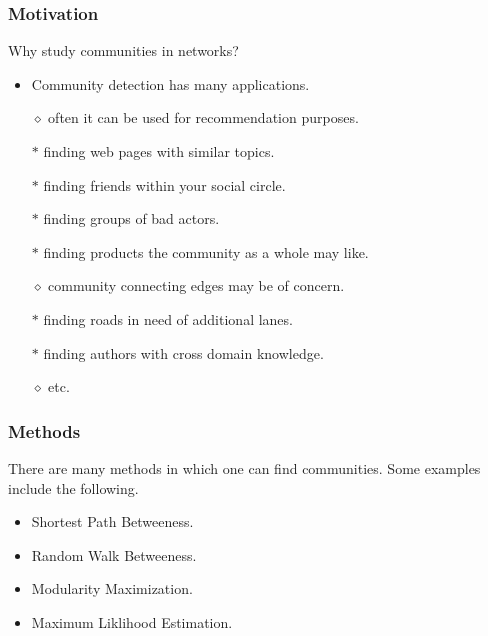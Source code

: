 \documentclass{beamer}
\begin{document}

\begin{frame}

    \frametitle{Motivation}

    Why study communities in networks?\pause

    \vspace{2.5mm}
    \begin{itemize}
        \item Community detection has many applications.\pause
        \item[$\diamond$] often it can be used for recommendation purposes.\pause
        \item[$\ast$] finding web pages with similar topics.\pause
        \item[$\ast$] finding friends within your social circle.\pause
        \item[$\ast$] finding groups of bad actors.\pause
        \item[$\ast$] finding products the community as a whole may like.\pause
        \item[$\diamond$] community connecting edges may be of concern.\pause
        \item[$\ast$] finding roads in need of additional lanes.\pause
        \item[$\ast$] finding authors with cross domain knowledge.\pause
        \item[$\diamond$] etc. 
    \end{itemize}

\end{frame}


\begin{frame}

    \frametitle{Methods}

    There are many methods in which one can find communities. Some examples include the following.\pause

    \vspace{2.5mm}
    \begin{itemize}
        \item Shortest Path Betweeness.\pause
        \item Random Walk Betweeness.\pause
        \item Modularity Maximization.\pause
        \item Maximum Liklihood Estimation. 
    \end{itemize}

\end{frame}
\end{document}

